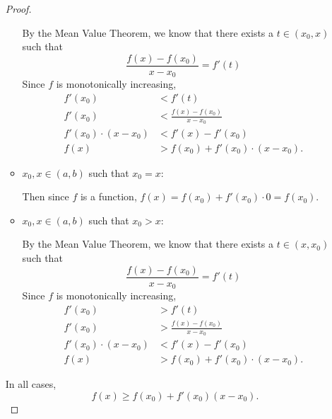 \documentclass{amsart}
\begin{document}
\begin{enumerate}[1.]
\begin{proof}
\begin{itemize}
            By the Mean Value Theorem, we know that there exists a $t \in (x_0, x)$ such that
            \[
                \frac{f(x) - f(x_0)}{x - x_0} = f'(t)
            \]
            Since $f$ is monotonically increasing,
            \begin{align*}
                 f'(x_0) &< f'(t) \\
                 f'(x_0) &< \frac{f(x) - f(x_0)}{x - x_0} \\
                 f'(x_0)\cdot (x - x_0) &< f'(x) - f'(x_0) \\
                 f(x) &> f(x_0) + f'(x_0)\cdot (x - x_0).
            \end{align*}

            \item $x_0,x \in (a,b)$ such that $x_0 = x$:

            Then since $f$ is a function, $f(x) = f(x_0) + f'(x_0)\cdot 0 = f(x_0)$.

            \item $x_0,x \in (a,b)$ such that $x_0 > x$:

            By the Mean Value Theorem, we know that there exists a $t \in (x, x_0)$ such that
            \[
                \frac{f(x) - f(x_0)}{x - x_0} = f'(t)
            \]
            Since $f$ is monotonically increasing,
            \begin{align*}
                 f'(x_0) &> f'(t) \\
                 f'(x_0) &> \frac{f(x) - f(x_0)}{x - x_0} \\
                 f'(x_0)\cdot (x - x_0) &< f'(x) - f'(x_0) \\
                 f(x) &> f(x_0) + f'(x_0)\cdot (x - x_0).
            \end{align*}
        \end{itemize}
        In all cases, 
        \[ f(x) \geq f(x_0) + f'(x_0)(x-x_0).\]
    \end{proof}


\end{enumerate}
\end{document}
